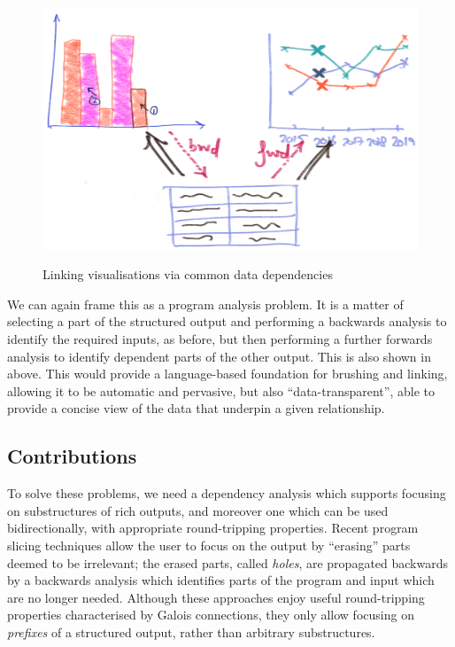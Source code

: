 \begin{figure}[H]
   {\includegraphics[scale=0.14]{fig/example/vis-linking.png}}
   \small
   
   \caption{Linking visualisations via common data dependencies}
   \label{fig:introduction:vis-linking}
\end{figure}

We can again frame this as a program analysis problem. It is a matter of selecting a part of the structured output and performing a backwards analysis to identify the required inputs, as before, but then performing a further forwards analysis to identify dependent parts of the other output. This is also shown in  above. This would provide a language-based foundation for brushing and linking, allowing it to be automatic and pervasive, but also ``data-transparent'', able to provide a concise view of the data that underpin a given relationship.

\subsection{Contributions}

To solve these problems, we need a dependency analysis which supports focusing on substructures of rich outputs, and moreover one which can be used bidirectionally, with appropriate round-tripping properties. Recent program slicing techniques \cite{perera12a,perera13a,ricciotti17} allow the user to focus on the output by ``erasing'' parts deemed to be irrelevant; the erased parts, called \emph{holes}, are propagated backwards by a backwards analysis which identifies parts of the program and input which are no longer needed. Although these approaches enjoy useful round-tripping properties characterised by Galois connections, they only allow focusing on \emph{prefixes} of a structured output, rather than arbitrary substructures.

